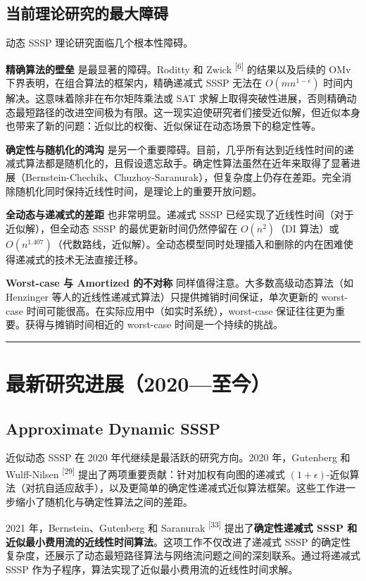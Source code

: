 \documentclass[12pt,a4paper]{ctexart}
\let\oldsection\section
\renewcommand{\section}{\clearpage\oldsection}
\begin{document}
\subsection{当前理论研究的最大障碍}

动态 SSSP 理论研究面临几个根本性障碍。

\textbf{精确算法的壁垒} 是最显著的障碍。Roditty 和 Zwick \textsuperscript{[6]}  的结果以及后续的 OMv 下界表明，在组合算法的框架内，精确递减式 SSSP 无法在 $O(mn^{1-\epsilon})$ 时间内解决。这意味着除非在布尔矩阵乘法或 SAT 求解上取得突破性进展，否则精确动态最短路径的改进空间极为有限。这一现实迫使研究者们接受近似解，但近似本身也带来了新的问题：近似比的权衡、近似保证在动态场景下的稳定性等。

\textbf{确定性与随机化的鸿沟} 是另一个重要障碍。目前，几乎所有达到近线性时间的递减式算法都是随机化的，且假设遗忘敌手。确定性算法虽然在近年来取得了显著进展（Bernstein-Chechik、Chuzhoy-Saranurak），但复杂度上仍存在差距。完全消除随机化同时保持近线性时间，是理论上的重要开放问题。

\textbf{全动态与递减式的差距} 也非常明显。递减式 SSSP 已经实现了近线性时间（对于近似解），但全动态 SSSP 的最优更新时间仍然停留在 $O(n^2)$（DI 算法）或 $O(n^{1.407})$（代数路线，近似解）。全动态模型同时处理插入和删除的内在困难使得递减式的技术无法直接迁移。

\textbf{Worst-case 与 Amortized 的不对称} 同样值得注意。大多数高级动态算法（如 Henzinger 等人的近线性递减式算法）只提供摊销时间保证，单次更新的 worst-case 时间可能很高。在实际应用中（如实时系统），worst-case 保证往往更为重要。获得与摊销时间相近的 worst-case 时间是一个持续的挑战。

\noindent\rule{\textwidth}{0.4pt}
\section{最新研究进展（2020—至今）}

\subsection{Approximate Dynamic SSSP}

近似动态 SSSP 在 2020 年代继续是最活跃的研究方向。2020 年，Gutenberg 和 Wulff-Nilsen \textsuperscript{[29]}  提出了两项重要贡献：针对加权有向图的递减式 $(1+\epsilon)$-近似算法（对抗自适应敌手），以及更简单的确定性递减式近似算法框架。这些工作进一步缩小了随机化与确定性算法之间的差距。

2021 年，Bernstein、Gutenberg 和 Saranurak \textsuperscript{[33]}  提出了\textbf{确定性递减式 SSSP 和近似最小费用流的近线性时间算法}。这项工作不仅改进了递减式 SSSP 的确定性复杂度，还展示了动态最短路径算法与网络流问题之间的深刻联系。通过将递减式 SSSP 作为子程序，算法实现了近似最小费用流的近线性时间求解。
\end{document}
